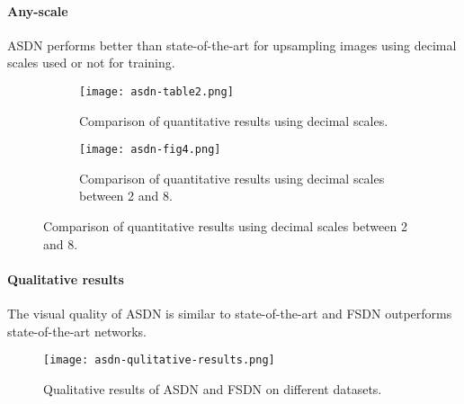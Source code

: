 \paragraph{Any-scale}
ASDN performs better than state-of-the-art for upsampling images using decimal scales used or not for training.
\begin{figure}[H]
    \begin{subfigure}{\textwidth}
        \centering
        \texttt{[image: asdn-table2.png]}
        \caption{Comparison of quantitative results using decimal scales.}
    \end{subfigure}
    \begin{subfigure}{\textwidth}
        \centering
        \texttt{[image: asdn-fig4.png]}
        \caption{Comparison of quantitative results using decimal scales between 2 and 8.}
    \end{subfigure}
\end{figure}

\paragraph{Qualitative results}
The visual quality of ASDN is similar to state-of-the-art and FSDN outperforms state-of-the-art networks.

\begin{figure}
    \centering
    \texttt{[image: asdn-qulitative-results.png]}
    \caption{Qualitative results of ASDN and FSDN on different datasets.}
\end{figure}


